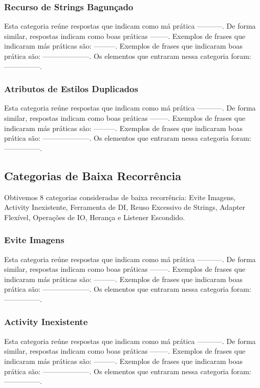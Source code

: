 \subsubsection{Recurso de Strings Bagunçado}
Esta categoria re\'une respostas que indicam como m\'a pr\'atica -----------. De forma similar, respostas indicam como boas pr\'aticas --------. Exemplos de frases que indicaram m\'as pr\'aticas s\~ao: ---------. Exemplos de frases que indicaram boas pr\'atica s\~ao: --------------------. Os elementos que entraram nessa categoria foram: ---------------. 

\subsubsection{Atributos de Estilos Duplicados}
Esta categoria re\'une respostas que indicam como m\'a pr\'atica -----------. De forma similar, respostas indicam como boas pr\'aticas --------. Exemplos de frases que indicaram m\'as pr\'aticas s\~ao: ---------. Exemplos de frases que indicaram boas pr\'atica s\~ao: --------------------. Os elementos que entraram nessa categoria foram: ---------------. 




\subsection{Categorias de Baixa Recorr\^encia}
Obtivemos 8 categorias consideradas de baixa recorr\^encia: Evite Imagens, Activity Inexistente, Ferramenta de DI, Reuso Excessivo de Strings, Adapter Flex\'ivel, Opera\c{c}\~oes de IO, Heran\c{c}a e Listener Escondido.

\subsubsection{Evite Imagens}
Esta categoria re\'une respostas que indicam como m\'a pr\'atica -----------. De forma similar, respostas indicam como boas pr\'aticas --------. Exemplos de frases que indicaram m\'as pr\'aticas s\~ao: ---------. Exemplos de frases que indicaram boas pr\'atica s\~ao: --------------------. Os elementos que entraram nessa categoria foram: ---------------. 


\subsubsection{Activity Inexistente}
Esta categoria re\'une respostas que indicam como m\'a pr\'atica -----------. De forma similar, respostas indicam como boas pr\'aticas --------. Exemplos de frases que indicaram m\'as pr\'aticas s\~ao: ---------. Exemplos de frases que indicaram boas pr\'atica s\~ao: --------------------. Os elementos que entraram nessa categoria foram: ---------------. 



